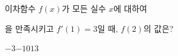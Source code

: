 이차함수 $f(x)$가 모든 실수 $x$에 대하여 \par\smallskip{}\par\smallskip\noindent 을 만족시키고 $f'(1)=3$일 때, $f(2)$의 값은?
\begin{choices32}{$-3$}{$-1$}{$0$}{$1$}{$3$}\end{choices32}
